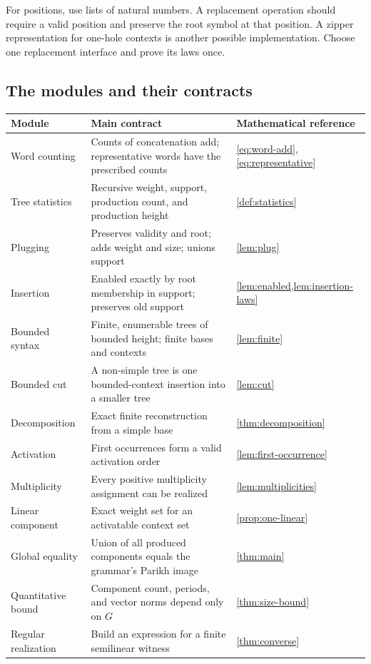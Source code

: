 \documentclass[11pt,a4paper]{article}
\numberwithin{equation}{section}
\theoremstyle{plain}
\theoremstyle{definition}
\theoremstyle{remark}
\begin{document}
For positions, use lists of natural numbers. A replacement operation should require a valid position and preserve the root symbol at that position. A zipper representation for one-hole contexts is another possible implementation. Choose one replacement interface and prove its laws once.

\Needspace{85mm}
\subsection{The modules and their contracts}
\small
\begin{longtable}{@{}L{27mm}L{62mm}L{52mm}@{}}
\toprule
Module & Main contract & Mathematical reference\\
\midrule
\endhead
Word counting & Counts of concatenation add; representative words have the prescribed counts & \eqref{eq:word-add}, \eqref{eq:representative}\\[3pt]
Tree statistics & Recursive weight, support, production count, and production height & \cref{def:statistics}\\[3pt]
Plugging & Preserves validity and root; adds weight and size; unions support & \cref{lem:plug}\\[3pt]
Insertion & Enabled exactly by root membership in support; preserves old support & \cref{lem:enabled,lem:insertion-laws}\\[3pt]
Bounded syntax & Finite, enumerable trees of bounded height; finite bases and contexts & \cref{lem:finite}\\[3pt]
Bounded cut & A non-simple tree is one bounded-context insertion into a smaller tree & \cref{lem:cut}\\[3pt]
Decomposition & Exact finite reconstruction from a simple base & \cref{thm:decomposition}\\[3pt]
Activation & First occurrences form a valid activation order & \cref{lem:first-occurrence}\\[3pt]
Multiplicity & Every positive multiplicity assignment can be realized & \cref{lem:multiplicities}\\[3pt]
Linear component & Exact weight set for an activatable context set & \cref{prop:one-linear}\\[3pt]
Global equality & Union of all produced components equals the grammar's Parikh image & \cref{thm:main}\\[3pt]
Quantitative bound & Component count, periods, and vector norms depend only on $G$ & \cref{thm:size-bound}\\[3pt]
Regular realization & Build an expression for a finite semilinear witness & \cref{thm:converse}\\
\bottomrule
\end{longtable}
\normalsize
\end{document}
